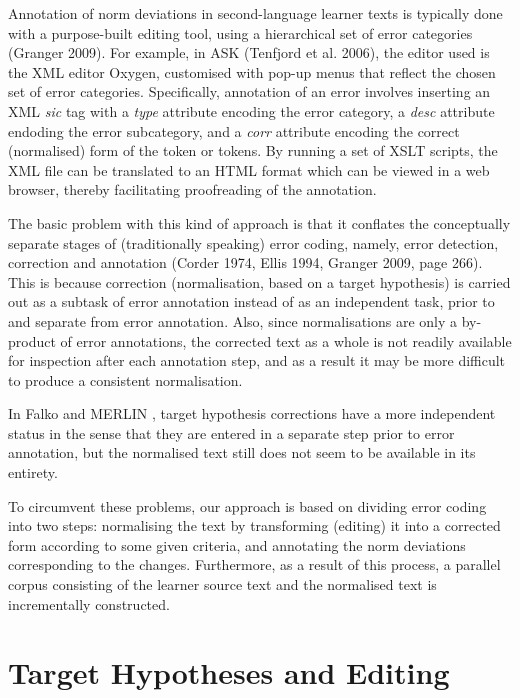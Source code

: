 \documentclass[10pt, a4paper]{article}
\begin{document}
Annotation of norm deviations in second-language learner texts is typically done with a purpose-built editing tool, using a hierarchical set of error categories (Granger 2009). For example, in ASK (Tenfjord et al. 2006), the editor used is the XML editor Oxygen,
customised with pop-up menus that reflect the chosen set of error
categories. Specifically, annotation of an error involves inserting an XML
{\em sic} tag with a {\em type} attribute encoding the error category, a {\em
desc} attribute endoding the error subcategory, and a {\em corr} attribute
encoding the correct (normalised) form of the token or tokens. By running a set of XSLT scripts, the XML file can be translated to an HTML format which can be viewed in a web browser, thereby facilitating proofreading of the annotation.

The basic problem with this kind of approach is that it conflates the conceptually separate stages of (traditionally speaking) error coding, namely, error detection, correction and annotation (Corder 1974, Ellis 1994, Granger 2009, page 266). This is because correction (normalisation, based on a target hypothesis) is carried out as a subtask of error annotation instead of as an independent task, prior to and separate from error annotation. Also, since normalisations are only a by-product of error annotations, the corrected text as a whole is not readily available for inspection after each annotation step, and as a result it may be more difficult to produce a consistent normalisation.

In Falko \cite{ludeling05multi-levelerror} and MERLIN  \cite{MERLIN2014},
target hypothesis corrections have a more independent status in the sense that they are entered in a separate step prior to error annotation, but the normalised text still does not seem to be available in its entirety.

To circumvent these problems, our approach is based on dividing error coding into two steps: normalising the text by transforming (editing) it into a corrected form according to some given criteria, and annotating the norm deviations corresponding to the changes. Furthermore, as a result of this process, a parallel corpus consisting of the learner source text and the normalised text is incrementally constructed.

\section{Target Hypotheses and Editing}
\label{sec:targethypothesis}
\end{document}
